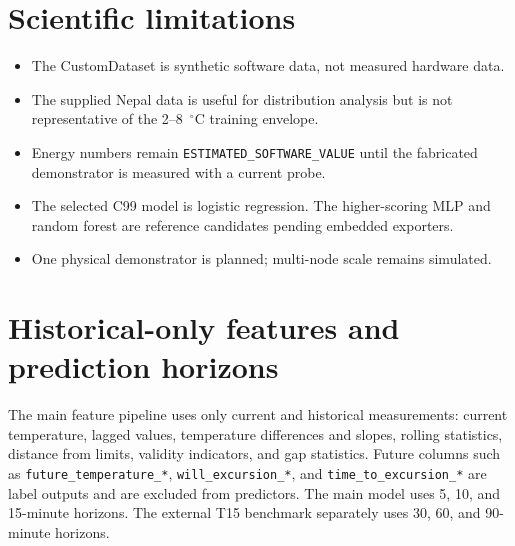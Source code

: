 \documentclass[11pt,a4paper]{article}
\begin{document}
\section{Scientific limitations}
\begin{itemize}[leftmargin=*]
  \item The CustomDataset is synthetic software data, not measured hardware data.
  \item The supplied Nepal data is useful for distribution analysis but is not
        representative of the 2--8~$^{\circ}$C training envelope.
  \item Energy numbers remain \texttt{ESTIMATED\_SOFTWARE\_VALUE} until the
        fabricated demonstrator is measured with a current probe.
  \item The selected C99 model is logistic regression. The higher-scoring MLP
        and random forest are reference candidates pending embedded exporters.
  \item One physical demonstrator is planned; multi-node scale remains simulated.
\end{itemize}

\section{Historical-only features and prediction horizons}
The main feature pipeline uses only current and historical measurements:
current temperature, lagged values, temperature differences and slopes,
rolling statistics, distance from limits, validity indicators, and gap
statistics. Future columns such as \texttt{future\_temperature\_*},
\texttt{will\_excursion\_*}, and \texttt{time\_to\_excursion\_*} are label
outputs and are excluded from predictors. The main model uses 5, 10, and
15-minute horizons. The external T15 benchmark separately uses 30, 60, and
90-minute horizons.
\end{document}
